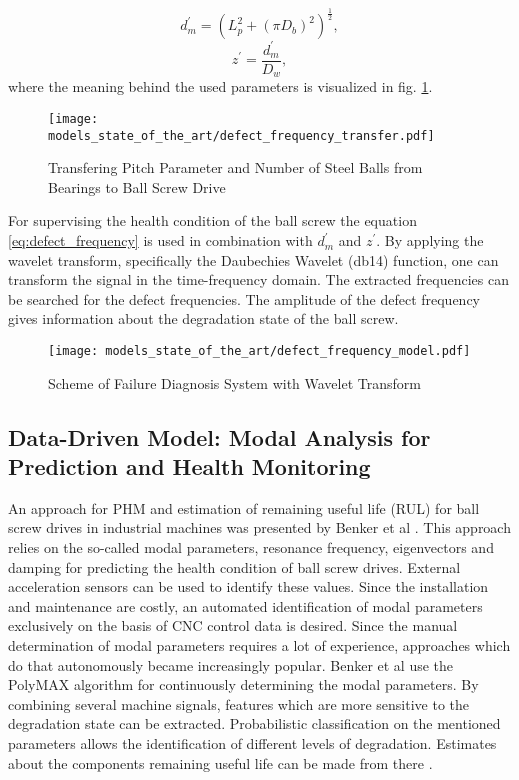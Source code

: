 \begin{equation}
    d_{m}^{'} = (L_{p}^{2}+(\pi D_{b})^{2})^{\frac{1}{2}},
\end{equation}
\begin{equation}
    z^{'} = \frac{d_{m}^{'}}{D_{w}},
\end{equation}
where the meaning behind the used parameters is visualized in fig. \ref{fig:defect_frequency_transfer}. 

\begin{figure}[H]
  \centering
  \texttt{[image: models\_state\_of\_the\_art/defect\_frequency\_transfer.pdf]}
  \caption{Transfering Pitch Parameter and Number of Steel Balls from Bearings to Ball Screw Drive \cite{Lee2015}}
  \label{fig:defect_frequency_transfer}
\end{figure}

For supervising the health condition of the ball screw the equation \ref{eq:defect_frequency} is used in combination with $d_{m}^{'}$ and $z^{'}$. By applying the wavelet transform, specifically the Daubechies Wavelet (db14) function, one can transform the signal in the time-frequency domain. The extracted frequencies can be searched for the defect frequencies. The amplitude of the defect frequency gives information about the degradation state of the ball screw.

\begin{figure}[H]
  \centering
  \texttt{[image: models\_state\_of\_the\_art/defect\_frequency\_model.pdf]}
  \caption{Scheme of Failure Diagnosis System with Wavelet Transform \cite{Lee2015}}
  \label{fig:defect_frequency_model}
\end{figure}



\subsection{Data-Driven Model: Modal Analysis for Prediction and Health Monitoring}
An approach for PHM and estimation of remaining useful life (RUL) for ball screw drives in industrial machines was presented by Benker et al . This approach relies on the so-called modal parameters, resonance frequency, eigenvectors and damping for predicting the health condition of ball screw drives. External acceleration sensors can be used to identify these values. Since the installation and maintenance are costly, an automated identification of modal parameters exclusively on the basis of CNC control data is desired. Since the manual determination of modal parameters requires a lot of experience, approaches which do that autonomously became increasingly popular. Benker et al use the PolyMAX algorithm  for continuously determining the modal parameters. By combining several machine signals, features which are more sensitive to the degradation state can be extracted. Probabilistic classification on the mentioned parameters allows the identification of different levels of degradation. Estimates about the components remaining useful life can be made from there \cite{Benker2020}.



